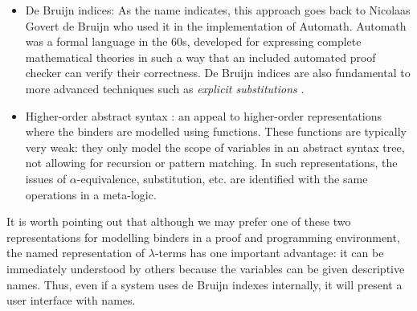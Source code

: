 \begin{itemize}
\item De Bruijn indices: As the name indicates, this approach
  goes back to Nicolaas Govert de Bruijn who used it in the
  implementation of Automath. Automath was a formal language in the
  60s, developed for expressing complete mathematical theories in such a way
  that an included automated proof checker can verify their
  correctness. De Bruijn indices are also fundamental to more advanced
  techniques such as \emph{explicit substitutions}
  \citep{Abadi:POPL90}.

\item Higher-order abstract syntax
  \citep{Pfenning88pldi}: an appeal to
  higher-order representations where the binders are modelled using
  functions. These functions are typically very weak: they only model the
  scope of variables in an abstract syntax tree, not allowing for recursion or pattern
  matching. In such representations, the issues of
  $\alpha$-equivalence, substitution, etc. are identified with the
  same operations in a meta-logic.
\end{itemize}


It is worth pointing out that although we may prefer one of these two
representations for modelling binders in a proof and programming environment, the named
representation of $\lambda$-terms has one important advantage: it can be
immediately understood by others because the variables can be
given descriptive names. Thus, even if a system uses de Bruijn indexes
internally, it will present a user interface with names.



